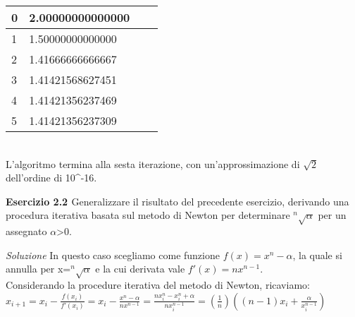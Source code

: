 \documentclass[20pt,a4paper]{book}
\begin{document}
\vspace{2mm}

\begin{tabular}{|l|l|l|l|}
\hline
0 & 2.00000000000000\\
\hline
1 & 1.50000000000000\\
\hline
2 & 1.41666666666667\\
\hline
3 & 1.41421568627451\\
\hline
4 & 1.41421356237469\\
\hline
5 & 1.41421356237309\\
\hline
\end{tabular}

\vspace{2mm}

\\L'algoritmo termina alla sesta iterazione, con un'approssimazione di \begin{math}\sqrt{2}\end{math} dell'ordine di 10^{-16}.



\vspace{10mm}


\textbf{\Large{Esercizio 2.2 }} Generalizzare il risultato del precedente esercizio, derivando una
procedura iterativa basata sul metodo di Newton per determinare \begin{math} ^{n}\sqrt{\alpha} \end{math} per un assegnato \begin{math} \alpha \end{math}>0.

\textit{Soluzione}
In questo caso scegliamo come funzione \begin{math} f(x)=x^{n}-\alpha \end{math}, la quale si annulla per x=\begin{math}^{n}\sqrt{\alpha}\end{math} e la cui derivata vale \begin{math} f'(x)=nx^{n-1}\end{math}.
\\Considerando la procedure iterativa del metodo di Newton, ricaviamo: \\


\begin{math} x_{i+1}=x_{i}-\frac{f(x_{i})}{f'(x_{i})}=x_{i}-\frac{x^{n}-\alpha}{nx^{n-1}}=
\frac{nx_{i}^{n}-x_{i}^{n}+\alpha}{nx_{i}^{n-1}}=(\frac{1}{n})((n-1)x_{i}+\frac{\alpha}{x_{i}^{n-1}})\end{math}
\end{document}
